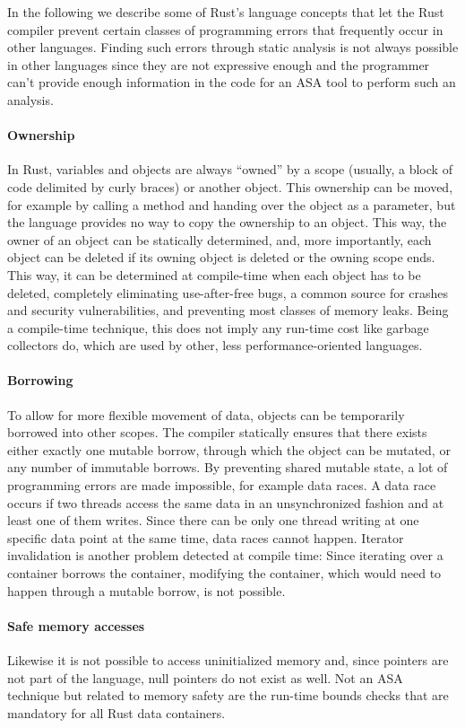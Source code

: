 \documentclass{scrartcl}
\begin{document}
In the following we describe some of Rust's language concepts that let the Rust compiler prevent certain classes of programming errors that frequently occur in other languages. Finding such errors through static analysis is not always possible in other languages since they are not expressive enough and the programmer can't provide enough information in the code for an ASA tool to perform such an analysis.

\paragraph{Ownership} In Rust, variables and objects are always ``owned'' by a scope (usually, a block of code delimited by curly braces) or another object. This ownership can be moved, for example by calling a method and handing over the object as a parameter, but the language provides no way to copy the ownership to an object. This way, the owner of an object can be statically determined, and, more importantly, each object can be deleted if its owning object is deleted or the owning scope ends. This way, it can be determined at compile-time when each object has to be deleted, completely eliminating use-after-free bugs, a common source for crashes and security vulnerabilities, and preventing most classes of memory leaks. Being a compile-time technique, this does not imply any run-time cost like garbage collectors do, which are used by other, less performance-oriented languages.

\paragraph{Borrowing} To allow for more flexible movement of data, objects can be temporarily borrowed into other scopes. The compiler statically ensures that there exists either exactly one mutable borrow, through which the object can be mutated, or any number of immutable borrows. By preventing shared mutable state, a lot of programming errors are made impossible, for example data races. A data race occurs if two threads access the same data in an unsynchronized fashion and at least one of them writes. Since there can be only one thread writing at one specific data point at the same time, data races cannot happen. Iterator invalidation is another problem detected at compile time: Since iterating over a container borrows the container, modifying the container, which would need to happen through a mutable borrow, is not possible.

\paragraph{Safe memory accesses} Likewise it is not possible to access uninitialized memory and, since pointers are not part of the language, null pointers do not exist as well. Not an ASA technique but related to memory safety are the run-time bounds checks that are mandatory for all Rust data containers.
\end{document}

